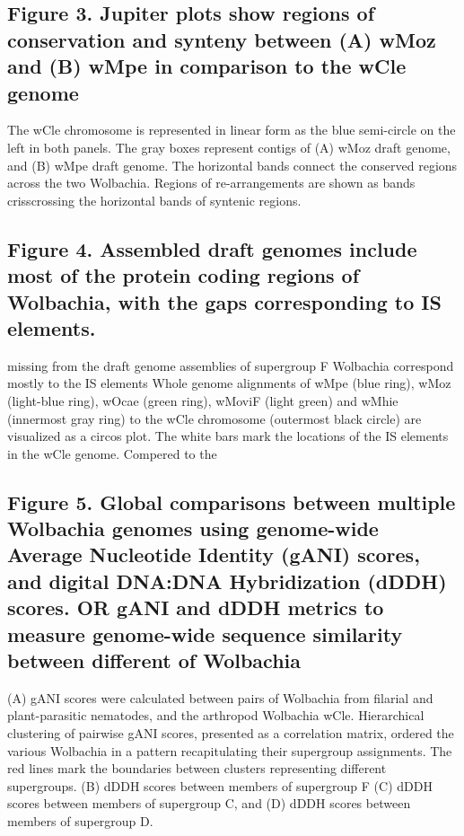\documentclass[10pt, a4paper, twocolumn]{article} %
\begin{document}
\subsection{Figure 3. Jupiter plots show regions of conservation and synteny between (A) wMoz and (B) wMpe in comparison to the wCle genome}
The wCle chromosome is represented in linear form as the blue semi-circle on the left in both panels. The gray boxes represent contigs of (A) wMoz draft genome, and (B) wMpe draft genome. The horizontal bands connect the conserved regions across the two Wolbachia. Regions of re-arrangements are shown as bands crisscrossing the horizontal bands of syntenic regions. 

\subsection{Figure 4. Assembled draft genomes include most of the protein coding regions of Wolbachia, with the gaps corresponding to IS elements.}
missing from the draft genome assemblies of supergroup F Wolbachia correspond mostly to the IS elements
Whole genome alignments of wMpe (blue ring), wMoz (light-blue ring), wOcae (green ring), wMoviF (light green) and wMhie (innermost gray ring) to the wCle chromosome (outermost black circle) are visualized as a circos plot. The white bars mark the locations of the IS elements in the wCle genome. Compered to the 


\subsection{Figure 5. Global comparisons between multiple Wolbachia genomes using genome-wide Average Nucleotide Identity (gANI) scores, and digital DNA:DNA Hybridization (dDDH) scores. OR gANI and dDDH metrics to measure genome-wide sequence similarity between different  of Wolbachia}
(A) gANI scores were calculated between pairs of Wolbachia from filarial and plant-parasitic nematodes, and the arthropod Wolbachia wCle. Hierarchical clustering of pairwise gANI scores, presented as a correlation matrix, ordered the various Wolbachia in a pattern recapitulating their supergroup assignments. The red lines mark the boundaries between clusters representing different supergroups. (B) dDDH scores between members of supergroup F (C) dDDH scores between members of supergroup C, and (D) dDDH scores between members of supergroup D. 
\end{document}
